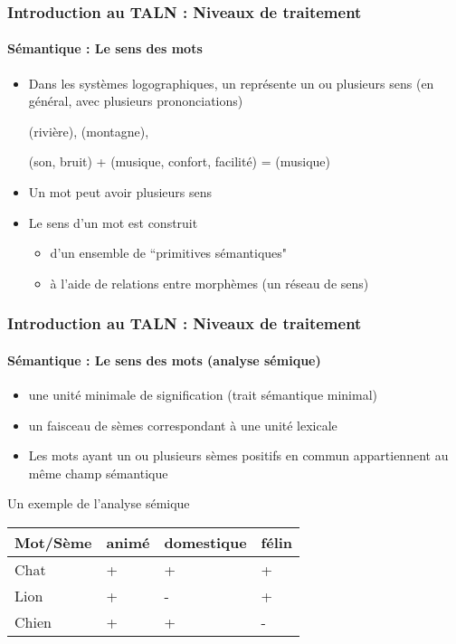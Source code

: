 \documentclass[xcolor=table]{beamer}
\begin{document}
\begin{frame}
\frametitle{Introduction au TALN : Niveaux de traitement}
\framesubtitle{Sémantique : Le sens des mots}

\begin{itemize}
	\item Dans les systèmes logographiques, un  représente un ou plusieurs sens (en général, avec plusieurs prononciations)
	
	\begin{CJK}{UTF8}{min}
		 (rivière),  (montagne), 
		
		 (son, bruit) +  (musique, confort, facilité) =  (musique)
	\end{CJK}

	\item Un mot peut avoir plusieurs sens
	\item Le sens d'un mot est construit
	\begin{itemize}
		\item d'un ensemble de ``primitives sémantiques"
		\item à l'aide de relations entre morphèmes (un réseau de sens)
	\end{itemize}
\end{itemize}

\end{frame}


\begin{frame}
\frametitle{Introduction au TALN : Niveaux de traitement}
\framesubtitle{Sémantique : Le sens des mots (analyse sémique)}

\begin{itemize}
	\item {} une unité minimale de signification (trait sémantique minimal)
	\item {} un faisceau de sèmes correspondant à une unité lexicale
	\item Les mots ayant un ou plusieurs sèmes positifs en commun appartiennent au même champ sémantique
\end{itemize}

\begin{exampleblock}{Un exemple de l'analyse sémique}
	\centering
	\begin{tabular}{|l|l|l|l|}
		\hline
		Mot/Sème & animé & domestique & félin \\
		\hline
		Chat & + & + & + \\
		\hline
		Lion & + & - & + \\
		\hline
		Chien & + & + & - \\
		\hline
	\end{tabular}
\end{exampleblock}

\end{frame}
\end{document}
